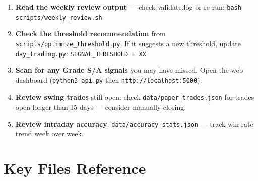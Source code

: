 \documentclass[11pt,a4paper]{article}
\begin{document}
\begin{enumerate}[leftmargin=1.4em, label=\textbf{\arabic*.}]
  \item \textbf{Read the weekly review output} --- check validate.log or re-run:
        \texttt{bash scripts/weekly\_review.sh}
  \item \textbf{Check the threshold recommendation} from \texttt{scripts/optimize\_threshold.py}.
        If it suggests a new threshold, update \texttt{day\_trading.py}: \texttt{SIGNAL\_THRESHOLD = XX}
  \item \textbf{Scan for any Grade S/A signals} you may have missed. Open the web dashboard
        (\texttt{python3 api.py} then \texttt{http://localhost:5000}).
  \item \textbf{Review swing trades} still open: check \texttt{data/paper\_trades.json} for trades
        open longer than 15 days --- consider manually closing.
  \item \textbf{Review intraday accuracy}: \texttt{data/accuracy\_stats.json} --- track win rate trend
        week over week.
\end{enumerate}

\section{Key Files Reference}
\end{document}
